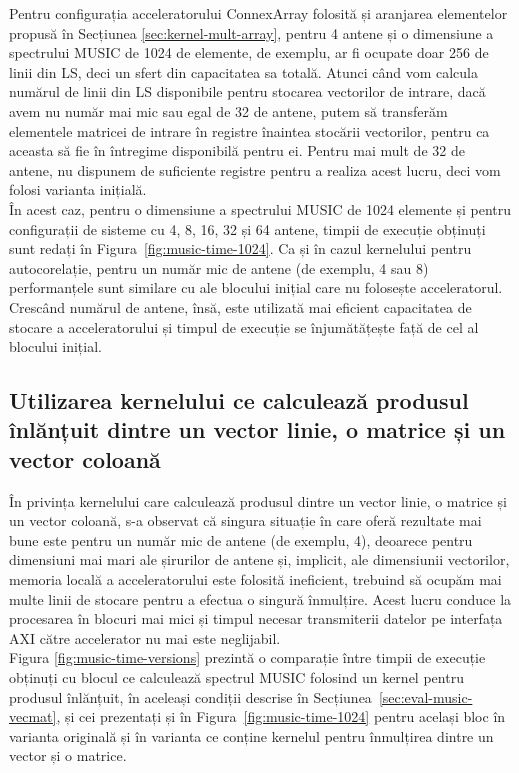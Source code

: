 Pentru configurația acceleratorului ConnexArray folosită și aranjarea
elementelor propusă în Secțiunea \ref{sec:kernel-mult-array}, pentru 4 antene și
o dimensiune a spectrului MUSIC de 1024 de elemente, de exemplu, ar fi ocupate doar
256 de linii din LS, deci un sfert din capacitatea sa totală. Atunci când vom
calcula numărul de linii din LS disponibile pentru stocarea vectorilor de
intrare, dacă avem nu număr mai mic sau egal de 32 de antene, putem să transferăm
elementele matricei de intrare în registre înaintea stocării vectorilor, pentru
ca aceasta să fie în întregime disponibilă pentru ei. Pentru mai mult de 32 de
antene, nu dispunem de suficiente registre pentru a realiza acest lucru, deci
vom folosi varianta inițială. \\

În acest caz, pentru o dimensiune a spectrului MUSIC de 1024 elemente și pentru
configurații de sisteme cu 4, 8, 16, 32 și 64 antene, timpii de execuție
obținuți sunt redați în Figura~\ref{fig:music-time-1024}. Ca și în cazul
kernelului pentru autocorelație, pentru un număr mic de antene (de exemplu, 4
sau 8) performanțele sunt similare cu ale blocului inițial care nu folosește
acceleratorul. Crescând numărul de antene, însă, este utilizată mai eficient
capacitatea de stocare a acceleratorului și timpul de execuție se înjumătățește
față de cel al blocului inițial.

\subsection{Utilizarea kernelului ce calculează produsul înlănțuit dintre un
vector linie, o matrice și un vector coloană}
\label{sec:eval-music-chained}

În privința kernelului care calculează produsul dintre un vector linie, o
matrice și un vector coloană, s-a observat că singura situație în care oferă
rezultate mai bune este pentru un număr mic de antene (de exemplu, 4), deoarece
pentru dimensiuni mai mari ale șirurilor de antene și, implicit, ale dimensiunii
vectorilor, memoria locală a acceleratorului este folosită ineficient, trebuind
să ocupăm mai multe linii de stocare pentru a efectua o singură înmulțire. Acest
lucru conduce la procesarea în blocuri mai mici și timpul necesar transmiterii
datelor pe interfața AXI către accelerator nu mai este neglijabil. \\

Figura \ref{fig:music-time-versions} prezintă o comparație între timpii de
execuție obținuți cu blocul ce calculează spectrul MUSIC folosind un kernel
pentru produsul înlănțuit, în aceleași condiții descrise în
Secțiunea~\ref{sec:eval-music-vecmat}, și cei prezentați și în
Figura~\ref{fig:music-time-1024} pentru același bloc în varianta originală și în
varianta ce conține kernelul pentru înmulțirea dintre un vector și o matrice.

